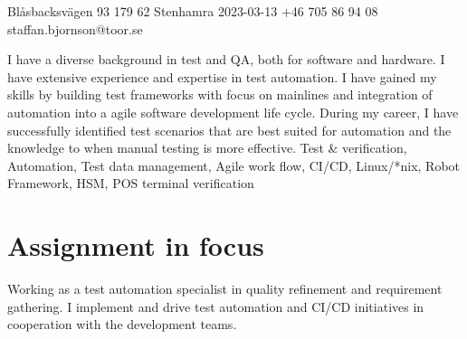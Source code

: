 \documentclass{sobCV}[2015/09/08]
\begin{document}
       {Blåsbacksvägen 93}
       {179 62 Stenhamra}
       {2023-03-13}
       {+46 705 86 94 08}
       {staffan.bjornson@toor.se}





   {
       I have a diverse background in test and QA, both for software and
       hardware.  I have extensive experience and expertise in test automation.
       I have gained my skills by building test frameworks with focus on
       mainlines and integration of automation into a agile software
       development life cycle. During my career, I have successfully identified
       test scenarios that are best suited for automation and the knowledge to
       when manual testing is more effective. 
   }{
       Test \& verification,
       Automation, 
       Test data management,
       Agile work flow,
       CI/CD,
       Linux/*nix,
       Robot Framework,
       HSM,
       POS terminal verification
    }


\section{Assignment in focus}
    Working as a test automation specialist in quality refinement and
    requirement gathering. I implement and drive test automation and CI/CD
    initiatives in cooperation with the development teams.
\end{document}
